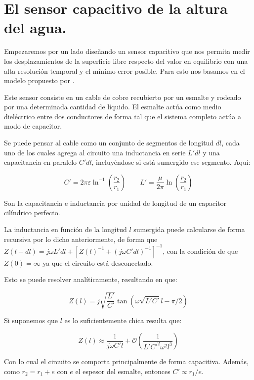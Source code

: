 \section{El sensor capacitivo de la altura del agua.}
Empezaremos por un lado diseñando un sensor capacitivo que nos permita medir los desplazamientos de la superficie libre respecto del valor en equilibrio con una alta resolución temporal y el mínimo error posible. Para esto nos basamos en el modelo propuesto por \cite{gordillozavaletaNonpropagatingHydrodynamicSolitons2012}.

Este sensor consiste en un cable de cobre recubierto por un esmalte y rodeado por una determinada cantidad de líquido. El esmalte actúa como medio dieléctrico entre dos conductores de forma tal que el sistema completo actúa a modo de capacitor.

Se puede pensar al cable como un conjunto de segmentos de longitud $dl$, cada uno de los cuales agrega al circuito una inductancia en serie $L'dl$ y una capacitancia en paralelo $C'dl$, incluyéndose si está sumergido ese segmento. Aquí:

\begin{equation}
	C' = 2\pi\varepsilon\ln^{-1}\left(\frac{r_2}{r_1}\right) \qquad L'= \frac{\mu}{2\pi}\ln\left(\frac{r_2}{r_1}\right)
\end{equation} 

Son la capacitancia e inductancia por unidad de longitud de un capacitor cilíndrico perfecto.

La inductancia en función de la longitud $l$ sumergida puede calcularse de forma recursiva por lo dicho anteriormente, de forma que $Z(l+dl) = j\omega L'dl + [Z(l)^{-1} + (j\omega C' dl)^{-1}]^{-1}$, con la condición de que $Z(0) = \infty$ ya que el circuito está desconectado.

Esto se puede resolver analíticamente, resultando en que:

\begin{equation}
	Z(l) = j\sqrt{\frac{L'}{C'}} \tan\left(\omega \sqrt{L'C'} l - \pi/2\right)
\end{equation}

Si suponemos que $l$ es lo suficientemente chica resulta que:

\begin{equation}
	Z(l) \approx \frac{1}{j\omega C' l} + \mathcal{O}\left(\frac{1}{L'C'^2\omega^2l^3}\right)
\end{equation} 

Con lo cual el circuito se comporta principalmente de forma capacitiva. Además, como $r_2=r_1+e$ con $e$ el espesor del esmalte, entonces $C'\propto r_1/e$.

